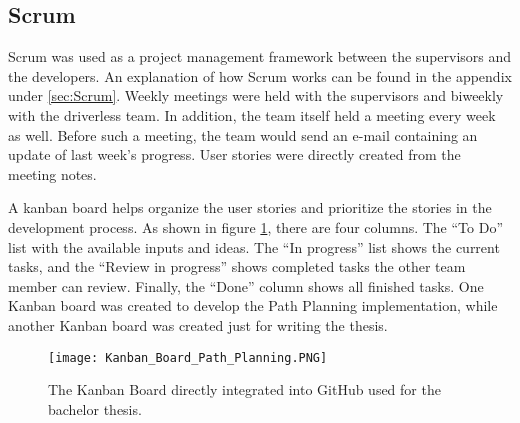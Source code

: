 \subsection{Scrum} \label{sec:Planning Method: Scrum}
Scrum was used as a project management framework between the supervisors and the developers. An explanation of how Scrum works can be found in the appendix under \ref{sec:Scrum}. Weekly meetings were held with the supervisors and biweekly with the driverless team. In addition, the team itself held a meeting every week as well. Before such a meeting, the team would send an e-mail containing an update of last week's progress. User stories were directly created from the meeting notes.

A kanban board helps organize the user stories and prioritize the stories in the development process. As shown in figure \ref{fig:Kanban Board Path Planning}, there are four columns. The ``To Do'' list with the available inputs and ideas. The ``In progress'' list shows the current tasks, and the ``Review in progress'' shows completed tasks the other team member can review. Finally, the ``Done'' column shows all finished tasks. One Kanban board was created to develop the Path Planning implementation, while another Kanban board was created just for writing the thesis.
\begin{figure}[H]
    \centering
    \texttt{[image: Kanban\_Board\_Path\_Planning.PNG]}
    \caption{The Kanban Board directly integrated into GitHub used for the bachelor thesis.}
    \label{fig:Kanban Board Path Planning}
\end{figure}


